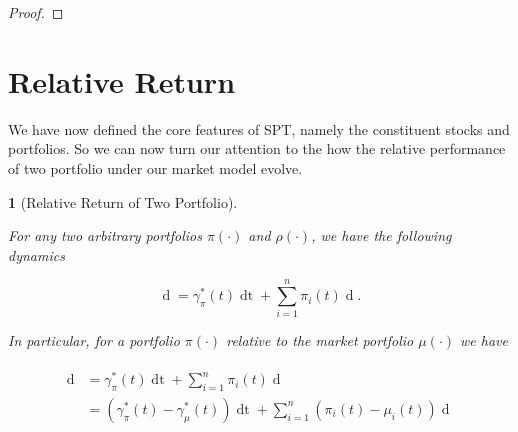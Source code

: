 \documentclass[british]{amsart} \usepackage{lmodern}
\numberwithin{equation}{section} \numberwithin{figure}{section}
\theoremstyle{plain} \newtheorem{thm}{\protect\theoremname}[section]
\theoremstyle{definition} \newtheorem{defn}[thm]{\protect\definitionname}
\theoremstyle{plain} \newtheorem{assumption}[thm]{\protect\assumptionname}
\theoremstyle{plain} \newtheorem{lem}[thm]{\protect\lemmaname}
\theoremstyle{plain} \newtheorem{prop}[thm]{\protect\propositionname}
\theoremstyle{remark} \newtheorem{rem}[thm]{\protect\remarkname}
\theoremstyle{plain} \newtheorem{cor}[thm]{\protect\corollaryname}
\renewcommand{\d}[1]{\mathop{\mathrm{d}{#1}}}
\begin{document}
\begin{proof}
\end{proof}

\newpage
\section{Relative Return}

We have now defined the core features of SPT, namely the constituent stocks and
portfolios. So we can now turn our attention to the how the relative performance of
two portfolio under our market model evolve.

\begin{lem} [Relative Return of Two Portfolio]
  \label{lem:relativereturnoftwoportfolios}

  For any two arbitrary portfolios $\pi(\cdot)$ and $\rho(\cdot)$, we have the
  following dynamics

  \begin{equation}    
    \label{eq:rrdynamics} 
      \d{\log{ \left( \frac{ V^{\pi}(t) }{V^{\rho}(t) } \right) } } = 
        \gamma_{\pi}^{*}(t)\d{t} + 
         \sum_{i=1}^{n} \pi_{i}(t) 
            \d{\log{ \left( \frac{ X_{i}(t) }{ V^{\rho}(t)} \right) }}. 
  \end{equation}

  In particular, for a portfolio $\pi(\cdot)$ relative to the market portfolio
  $\mu(\cdot)$ we have

  \begin{gather} 
    \label{eq:rrdynamics2} 
    \begin{split} 
      \d{ \log{ \left( \frac{V^{\pi}(t) }{ V^{\mu}(t) } \right) } } 
      &= \gamma_{\pi}^{*}(t)\d{t} + 
            \sum_{i=1}^{n} \pi_{i}(t)  \d{ \log{\mu_{i}(t)} } \\ 
      &= (\gamma_{\pi}^{*}(t) - \gamma_{\mu}^{*}(t)) \d{t} +
            \sum_{i=1}^{n} (\pi_{i}(t) - \mu_{i}(t)) \d{\log{\mu_{i}(t)} } \\ 
    \end{split} 
  \end{gather}

\end{lem}
\end{document}
